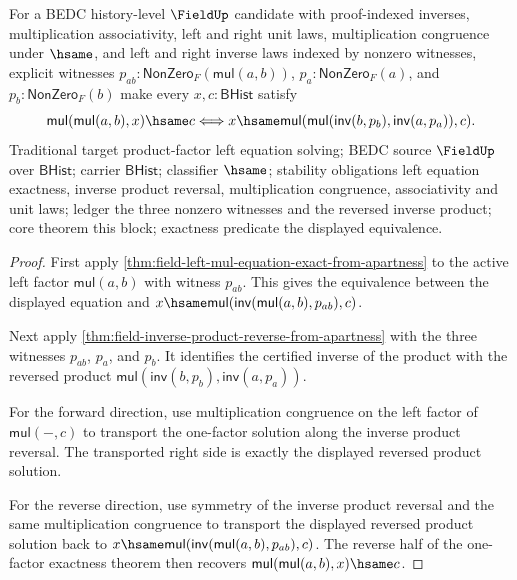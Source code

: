 \begin{theorem}
\label{thm:field-product-left-mul-equation-exact-from-apartness}
For a BEDC history-level $\FieldUp$ candidate with proof-indexed inverses,
multiplication associativity, left and right unit laws, multiplication
congruence under $\hsame$, and left and right inverse laws indexed by nonzero
witnesses, explicit witnesses
$p_{ab}:\mathsf{NonZero}_F(\mathsf{mul}(a,b))$,
$p_a:\mathsf{NonZero}_F(a)$, and $p_b:\mathsf{NonZero}_F(b)$ make every
$x,c:\mathsf{BHist}$ satisfy
$$
\mathsf{mul}(\mathsf{mul}(a,b),x)\hsame c
\Longleftrightarrow
x\hsame \mathsf{mul}(\mathsf{mul}(\mathsf{inv}(b,p_b),\mathsf{inv}(a,p_a)),c).
$$
Traditional target product-factor left equation solving; BEDC source
$\FieldUp$ over $\mathsf{BHist}$; carrier $\mathsf{BHist}$; classifier
$\hsame$; stability obligations left equation exactness, inverse product
reversal, multiplication congruence, associativity and unit laws; ledger the
three nonzero witnesses and the reversed inverse product; core theorem this
block; exactness predicate the displayed equivalence.
\end{theorem}
\begin{proof}
First apply
\autoref{thm:field-left-mul-equation-exact-from-apartness} to the active
left factor $\mathsf{mul}(a,b)$ with witness $p_{ab}$. This gives the
equivalence between the displayed equation and
$x\hsame\mathsf{mul}(\mathsf{inv}(\mathsf{mul}(a,b),p_{ab}),c)$.

Next apply
\autoref{thm:field-inverse-product-reverse-from-apartness} with the three
witnesses $p_{ab}$, $p_a$, and $p_b$. It identifies the certified inverse of
the product with the reversed product
$\mathsf{mul}(\mathsf{inv}(b,p_b),\mathsf{inv}(a,p_a))$.

For the forward direction, use multiplication congruence on the left factor
of $\mathsf{mul}(-,c)$ to transport the one-factor solution along the inverse
product reversal. The transported right side is exactly the displayed reversed
product solution.

For the reverse direction, use symmetry of the inverse product reversal and
the same multiplication congruence to transport the displayed reversed product
solution back to
$x\hsame\mathsf{mul}(\mathsf{inv}(\mathsf{mul}(a,b),p_{ab}),c)$. The reverse
half of the one-factor exactness theorem then recovers
$\mathsf{mul}(\mathsf{mul}(a,b),x)\hsame c$.
\end{proof}

